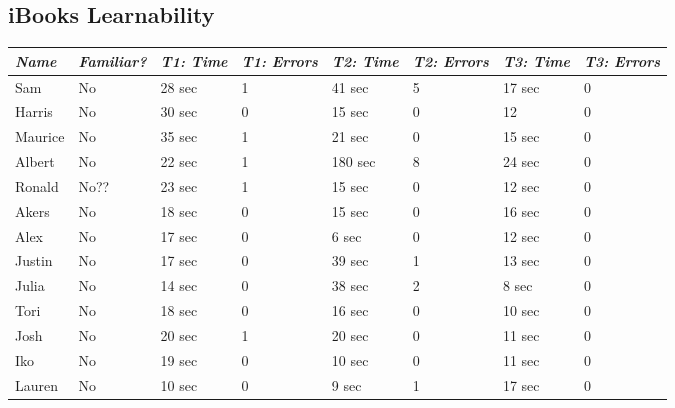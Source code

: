 \documentclass[journal,letterpaper]{article}
\begin{document}
    \subsection{iBooks Learnability}
    \begin{center}
        \centering
        \begin{tabular}{|l|l|l|l|l|l|l|l|}
            \hline
            \emph{Name} & \emph{Familiar?} & \emph{T1: Time} & \emph{T1: Errors} & \emph{T2: Time} & \emph{T2: Errors} & \emph{T3: Time} & \emph{T3: Errors} \\
            \hline
            Sam & No & 28 sec & 1 & 41 sec & 5 & 17 sec & 0 \\
            \hline
            Harris & No & 30 sec & 0 & 15 sec & 0 & 12 & 0 \\
            \hline
            Maurice & No & 35 sec & 1 & 21 sec & 0 & 15 sec & 0 \\
            \hline
            Albert & No & 22 sec & 1 & 180 sec & 8 & 24 sec & 0 \\
            \hline
            Ronald & No?? & 23 sec & 1 & 15 sec & 0 & 12 sec & 0 \\
            \hline
            Akers & No & 18 sec & 0 & 15 sec & 0 & 16 sec & 0 \\
            \hline
            Alex & No & 17 sec & 0 & 6 sec & 0 & 12 sec & 0 \\
            \hline
            Justin & No & 17 sec & 0 & 39 sec & 1 & 13 sec & 0 \\
            \hline
            Julia & No & 14 sec & 0 & 38 sec & 2 & 8 sec & 0 \\
            \hline
            Tori & No & 18 sec & 0 & 16 sec & 0 & 10 sec & 0 \\
            \hline
            Josh & No & 20 sec & 1 & 20 sec & 0 & 11 sec & 0 \\
            \hline
            Iko & No & 19 sec & 0 & 10 sec & 0 & 11 sec & 0 \\
            \hline
            Lauren & No & 10 sec & 0 & 9 sec & 1 & 17 sec & 0 \\
        \end{tabular}
    \end{center}
\end{document}
